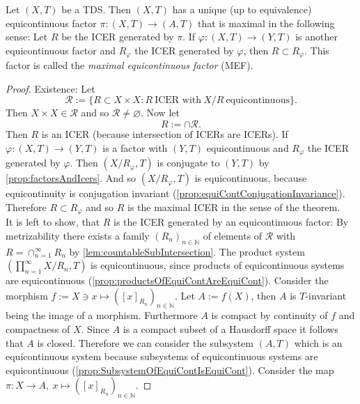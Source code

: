 \begin{theorem}
  Let $(X,T)$ be a TDS.
  Then $(X,T)$ has a unique (up to equivalence) equicontinuous factor $\pi : (X,T) \to (A,T)$ that is maximal in the following sense:
  Let $R$ be the ICER generated by $\pi$.
  If $\varphi : (X,T) \to (Y,T)$ is another equicontinuous factor and $R_\varphi$ the ICER generated by $\varphi$, then $R \subset R_\varphi$.
  This factor is called the \emph{maximal equicontinuous factor} (MEF).
\end{theorem}
\begin{proof}
  Existence:
  Let
  \begin{equation*}
    \mathcal{R} := \{ R \subset X \times X : R \ \text{ICER with} \ X/R \ \text{equicontinuous}\}.
  \end{equation*}
  Then $ X \times X \in \mathcal{R}$ and so $\mathcal{R} \neq \varnothing$.
    Now let 
  \begin{equation*}
    R:= \cap \mathcal{R}.
  \end{equation*}
  Then $R$ is an ICER (because intersection of ICERs are ICERs).
  If $\varphi : (X,T)\to (Y,T)$ is a factor with $(Y,T)$ equicontinuous and $R_\varphi$ the ICER generated by $\varphi$. Then $(X/R_\varphi,T)$ is conjugate to $(Y,T)$ by \cref{prop:factorsAndIcers}.
  And so $(X/R_\varphi,T)$ is equicontinuous, because equicontinuity is conjugation invariant (\cref{prop:equiContConjugationInvariance}).
  Therefore $R \subset R_\varphi$ and so $R$ is the maximal ICER in the sense of the theorem.\\
  It is left to show, that $R$ is the ICER generated by an equicontinuous factor:
  By metrizability there exists a family $(R_n)_{n\in\mathbb{N}}$ of elements of $\mathcal{R}$ with
  $R = \cap_{n=1}^\infty R_n$ by \cref{lem:countableSubIntersection}.
  The product system $(\prod_{n=1}^\infty X/R_n,T)$ is equicontinuous, since products of equicontinuous systems are equicontinuous (\cref{prop:productsOfEquiContAreEquiCont}).
  Consider the morphism $f:= X \ni x  \mapsto ([x]_{R_n})_{n \in \mathbb{N}}$.
  Let $A:= f(X)$, then $A$ is $T$-invariant being the image of a morphism.
  Furthermore $A$ is compact by continuity of $f$ and compactness of $X$.
  Since $A$ is a compact subset of a Hausdorff space it follows that $A$ is closed.
  Therefore we can consider the subsystem $(A,T)$ which is an equicontinuous system because subsystems of equicontinuous systems are equicontinuous (\cref{prop:SubsystemOfEquiContIsEquiCont}).
  Consider the map $\pi: X \to  A , \  x  \mapsto ([x]_{R_n})_{n \in \mathbb{N}}$.

\end{proof}
